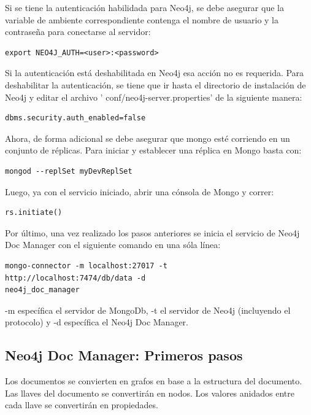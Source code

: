 \documentclass[conference]{IEEEtran}
\begin{document}
Si se tiene la autenticaci\'on habilidada para Neo4j, se debe asegurar que la variable de ambiente  correspondiente contenga el nombre de usuario y la contraseña para conectarse al servidor:

\begin{lstlisting}
export NEO4J_AUTH=<user>:<password>
\end{lstlisting}

Si la autenticaci\'on est\'a deshabilitada en Neo4j esa acci\'on no es requerida. Para deshabilitar la autenticación, se tiene que ir hasta el directorio de instalaci\'on de Neo4j y editar el archivo ' conf/neo4j-server.properties'  de la siguiente manera:

\begin{lstlisting}
dbms.security.auth_enabled=false
\end{lstlisting}

Ahora, de forma adicional se debe asegurar que mongo est\'e corriendo en un conjunto de r\'eplicas. Para iniciar y establecer una réplica en Mongo basta con:

\begin{lstlisting}
mongod --replSet myDevReplSet
\end{lstlisting}

Luego, ya con el servicio iniciado, abrir una c\'onsola de Mongo y correr:

\begin{lstlisting}
rs.initiate()
\end{lstlisting}

Por \'ultimo, una vez realizado los pasos anteriores se inicia el servicio de Neo4j Doc Manager con el siguiente comando en una s\'ola l\'inea:

\begin{lstlisting}
mongo-connector -m localhost:27017 -t
http://localhost:7474/db/data -d
neo4j_doc_manager
\end{lstlisting}

-m espec\'ifica el servidor de MongoDb, -t el servidor de Neo4j (incluyendo el protocolo) y -d espec\'ifica el Neo4j Doc Manager.

\subsection*{Neo4j Doc Manager: Primeros pasos}

Los documentos se convierten en grafos en base a la estructura del documento. Las llaves del documento se convertir\'an en nodos. Los valores anidados entre cada llave se convertir\'an en propiedades.
\end{document}
